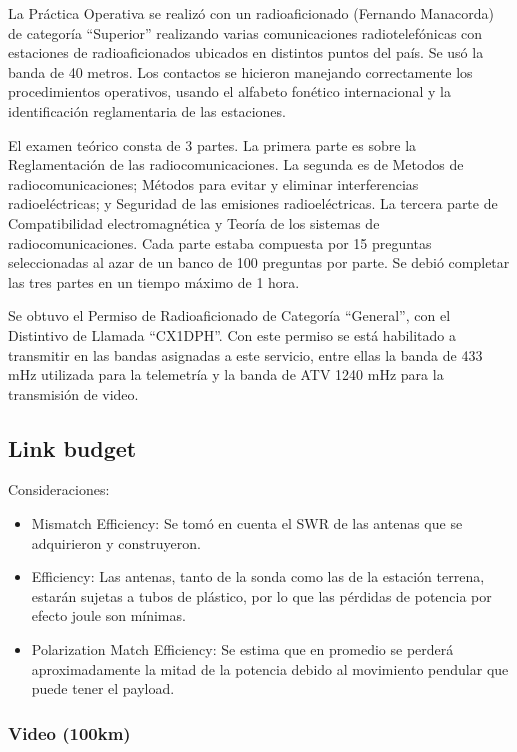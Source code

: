 \documentclass[12pt,a4paper]{article}
\begin{document}
La Práctica Operativa se realizó con un radioaficionado (Fernando Manacorda) de categoría ``Superior'' realizando varias comunicaciones radiotelefónicas con estaciones de radioaficionados ubicados en distintos puntos del país. Se usó la banda de 40 metros. Los contactos se hicieron manejando correctamente los procedimientos operativos, usando el alfabeto fonético internacional y la identificación reglamentaria de las estaciones.

El examen teórico consta de 3 partes. La primera parte es sobre la Reglamentación de las radiocomunicaciones. La segunda es de Metodos de radiocomunicaciones; Métodos para evitar y eliminar interferencias radioeléctricas; y Seguridad de las emisiones radioeléctricas. La tercera parte de Compatibilidad electromagnética y Teoría de los sistemas de radiocomunicaciones. Cada parte estaba compuesta por 15 preguntas seleccionadas al azar de un banco de 100 preguntas por parte. Se debió completar las tres partes en un tiempo máximo de 1 hora.

Se obtuvo el Permiso de Radioaficionado de Categoría ``General'', con el Distintivo de Llamada ``CX1DPH''. Con este permiso se está habilitado a transmitir en las bandas asignadas a este servicio, entre ellas la banda de 433 mHz utilizada para la telemetría y la banda de ATV 1240 mHz para la transmisión de video.

\subsection{Link budget}\label{link-budget-diseno}

Consideraciones:
\begin{itemize}
    \item Mismatch Efficiency: Se tomó en cuenta el SWR de las antenas que se adquirieron y construyeron.
    \item Efficiency: Las antenas, tanto de la sonda como las de la estación terrena, estarán sujetas a tubos de plástico, por lo que las pérdidas de potencia por efecto joule son mínimas.
    \item Polarization Match Efficiency: Se estima que en promedio se perderá aproximadamente la mitad de la potencia debido al movimiento pendular que puede tener el payload.
\end{itemize}

\subsubsection{Video (100km)}\label{link-budget-video}
\end{document}
